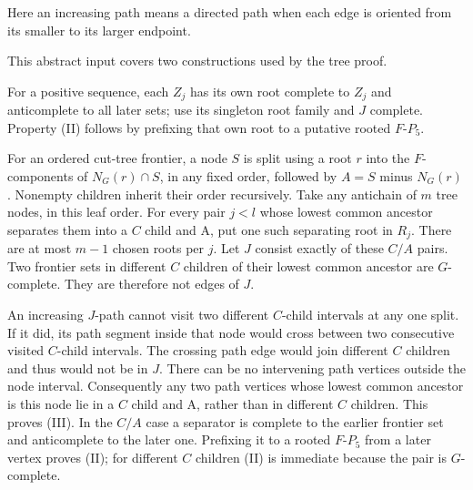 \documentclass[11pt,a4paper]{article}
\theoremstyle{definition}
\theoremstyle{remark}
\numberwithin{equation}{section}
\begin{document}
Here an increasing path means a directed path when each edge is oriented from its smaller to its larger endpoint.

This abstract input covers two constructions used by the tree proof.

For a positive sequence, each \(Z_{j}\) has its own root complete to \(Z_{j}\) and anticomplete to all later sets; use its singleton root family and \(J\) complete. Property (II) follows by prefixing that own root to a putative rooted \(F\text{-}P_{5}\).

For an ordered cut-tree frontier, a node \(S\) is split using a root \(r\) into the \(F\)-components of \(N_{G}(r) \cap  S\), in any fixed order, followed by \(A=S\) minus \(N_{G}(r)\). Nonempty children inherit their order recursively. Take any antichain of \(m\) tree nodes, in this leaf order. For every pair \(j<l\) whose lowest common ancestor separates them into a \(C\) child and A, put one such separating root in \(R_{j}\). There are at most \(m-1\) chosen roots per \(j\). Let \(J\) consist exactly of these \(C/A\) pairs. Two frontier sets in different \(C\) children of their lowest common ancestor are \(G\)-complete. They are therefore not edges of \(J\).

An increasing \(J\)-path cannot visit two different \(C\)-child intervals at any one split. If it did, its path segment inside that node would cross between two consecutive visited \(C\)-child intervals. The crossing path edge would join different \(C\) children and thus would not be in \(J\). There can be no intervening path vertices outside the node interval. Consequently any two path vertices whose lowest common ancestor is this node lie in a \(C\) child and A, rather than in different \(C\) children. This proves (III). In the \(C/A\) case a separator is complete to the earlier frontier set and anticomplete to the later one. Prefixing it to a rooted \(F\text{-}P_{5}\) from a later vertex proves (II); for different \(C\) children (II) is immediate because the pair is \(G\)-complete.
\end{document}
